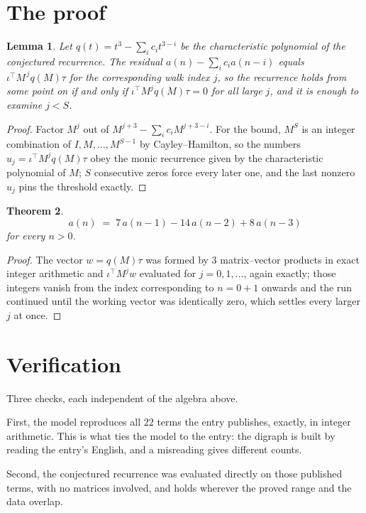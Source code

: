 \documentclass[11pt,a4paper]{article}
\theoremstyle{plain}
\newtheorem{theorem}{Theorem}
\newtheorem{lemma}[theorem]{Lemma}
\theoremstyle{definition}
\begin{document}
\section{The proof}

\begin{lemma}\label{lem:crit}
Let $q(t)=t^{3}-\sum_i c_it^{3-i}$ be the characteristic polynomial of the
conjectured recurrence. The residual $a(n)-\sum_ic_ia(n-i)$ equals
$\iota^{\!\top}M^{\,j}q(M)\tau$ for the corresponding walk index $j$, so the recurrence
holds from some point on if and only if $\iota^{\!\top}M^{j}q(M)\tau=0$ for all large $j$,
and it is enough to examine $j<S$.
\end{lemma}

\begin{proof}
Factor $M^{j}$ out of $M^{j+3}-\sum_ic_iM^{j+3-i}$. For the bound, $M^{S}$
is an integer combination of $I,M,\dots,M^{S-1}$ by Cayley--Hamilton, so the numbers
$u_j=\iota^{\!\top}M^{j}q(M)\tau$ obey the monic recurrence given by the characteristic
polynomial of $M$; $S$ consecutive zeros force every later one, and the last nonzero $u_j$
pins the threshold exactly.
\end{proof}

\begin{theorem}
\[
a(n)\;=\;7\,a(n-1) - 14\,a(n-2) + 8\,a(n-3)
\]
for every $n>0$.
\end{theorem}

\begin{proof}
The vector $w=q(M)\tau$ was formed by $3$ matrix--vector products in exact integer
arithmetic and $\iota^{\!\top}M^{j}w$ evaluated for $j=0,1,\dots$, again exactly; those
integers vanish from the index corresponding to $n=0+1$ onwards and the run continued
until the working vector was identically zero, which settles every larger $j$ at once.
\end{proof}

\section{Verification}

Three checks, each independent of the algebra above.

First, the model reproduces all $22$ terms the entry publishes, exactly, in integer
arithmetic. This is what ties the model to the entry: the digraph is built by reading the
entry's English, and a misreading gives different counts.

Second, the conjectured recurrence was evaluated directly on those published terms, with no
matrices involved, and holds wherever the proved range and the data overlap.
\end{document}
